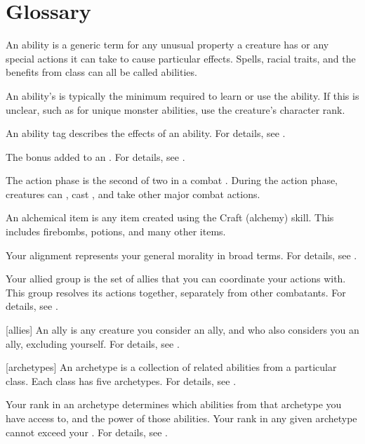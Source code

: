 \chapter{Glossary}\label{Glossary}

 An ability is a generic term for any unusual property a creature has or any special actions it can take to cause particular effects.
Spells, racial traits, and the benefits from class  can all be called abilities.

 An ability's  is typically the minimum  required to learn or use the ability.
If this is unclear, such as for unique monster abilities, use the creature's character rank.

 An ability tag describes the effects of an ability.
For details, see .

 The bonus added to an .
For details, see .

 The action phase is the second of two  in a combat .
During the action phase, creatures can , cast , and take other major combat actions.

 An alchemical item is any item created using the Craft (alchemy) skill.
This includes firebombs, potions, and many other items.

 Your alignment represents your general morality in broad terms.
For details, see .

 Your allied group is the set of allies that you can coordinate your actions with.
This group resolves its actions together, separately from other combatants.
For details, see .

[allies] An ally is any creature you consider an ally, and who also considers you an ally, excluding yourself.
For details, see .

[archetypes] An archetype is a collection of related abilities from a particular class.
Each class has five archetypes.
For details, see .

 Your rank in an archetype determines which abilities from that archetype you have access to, and the power of those abilities.
Your rank in any given archetype cannot exceed your .
For details, see .


